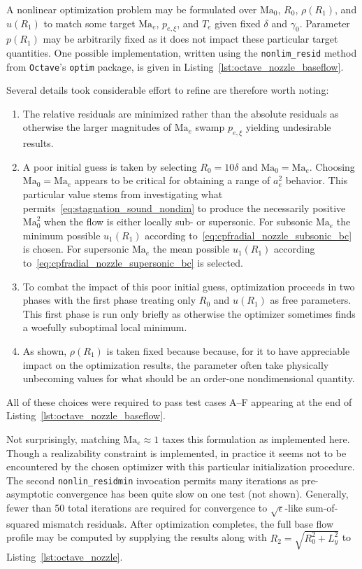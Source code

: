 \documentclass[letterpaper,11pt,nointlimits,reqno]{amsart}
\makeatletter
\newcommand{\Mach}[1][]{\mbox{Ma}_{#1}}
\newcommand\mynobreakpar{\par\nobreak\@afterheading}
\makeatother
\begin{document}
A nonlinear optimization problem may be formulated over $\Mach[0]$, $R_0$,
$\rho\!\left(R_1\right)$, and $u\!\left(R_1\right)$ to match some target
$\Mach[e]{}$, $p_{e,\xi}$, and $T_e$ given fixed $\delta$ and $\gamma_0$.
Parameter $p\!\left(R_1\right)$ may be arbitrarily fixed as it does not impact
these particular target quantities.  One possible implementation, written using
the \texttt{nonlim\_resid} method from \texttt{Octave}'s \texttt{optim}
package, is given in Listing~\ref{lst:octave_nozzle_baseflow}.

Several details took considerable effort to refine are therefore worth
noting:\mynobreakpar
\begin{enumerate}
  \item The relative residuals are minimized rather than the absolute residuals
    as otherwise the larger magnitudes of $\Mach[e]{}$ swamp $p_{e,\xi}$
    yielding undesirable results.
  \item A poor initial guess is taken by selecting $R_0 = 10\delta$ and
    $\Mach[0]{}=\Mach[e]{}$.  Choosing $\Mach[0]{}=\Mach[e]{}$ appears to be
    critical for obtaining a range of $a_e^2$ behavior.  This particular value
    stems from investigating what permits~\eqref{eq:stagnation_sound_nondim} to
    produce the necessarily positive $\Mach[0]^2$ when the flow is either
    locally sub- or supersonic.  For subsonic $\Mach[e]{}$ the minimum possible
    $u_1\!\left(R_1\right)$ according
    to~\eqref{eq:cpfradial_nozzle_subsonic_bc} is chosen.  For supersonic
    $\Mach[e]{}$ the mean possible $u_1\!\left(R_1\right)$ according
    to~\eqref{eq:cpfradial_nozzle_supersonic_bc} is selected.
  \item To combat the impact of this poor initial guess, optimization proceeds
   in two phases with the first phase treating only $R_0$ and
   $u\!\left(R_1\right)$ as free parameters.  This first phase is run only
   briefly as otherwise the optimizer sometimes finds a woefully suboptimal
   local minimum.
  \item As shown, $\rho\!\left(R_1\right)$ is taken fixed because because, for
    it to have appreciable impact on the optimization results, the parameter
    often take physically unbecoming values for what should be an order-one
    nondimensional quantity.
\end{enumerate}
All of these choices were required to pass test cases A--F appearing at the end
of Listing~\ref{lst:octave_nozzle_baseflow}.

Not surprisingly, matching $\Mach[e]{}\approx{}1$ taxes this formulation as
implemented here.  Though a realizability constraint is implemented, in practice
it seems not to be encountered by the chosen optimizer with this particular
initialization procedure.  The second \texttt{nonlin\_residmin} invocation
permits many iterations as pre-asymptotic convergence has been quite slow on
one test (not shown).  Generally, fewer than 50 total iterations are required
for convergence to $\sqrt{\epsilon}$-like sum-of-squared mismatch residuals.
After optimization completes, the full base flow profile may be computed by
supplying the results along with $R_2 = \sqrt{R_0^2 + L_y^2}$ to
Listing~\ref{lst:octave_nozzle}.
\end{document}

